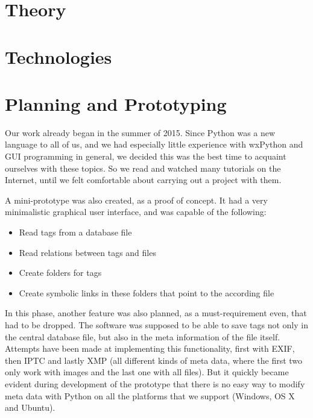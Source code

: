 \section{Theory}
\def \kapitelautor {Christoph Führer}

\section{Technologies}
\def \kapitelautor {Christoph Führer}

\section{Planning and Prototyping} %
\def \kapitelautor {Erik Ritschl}

Our work already began in the summer of 2015. Since Python was a new language to all of us, and we had especially little experience with wxPython and GUI programming in general, we decided this was the best time to acquaint ourselves with these topics. So we read and watched many tutorials on the Internet, until we felt comfortable about carrying out a project with them.

A mini-prototype was also created, as a proof of concept. It had a very minimalistic graphical user interface, and was capable of the following:

\begin{itemize}
	\item Read tags from a database file
	\item Read relations between tags and files
	\item Create folders for tags
	\item Create symbolic links in these folders that point to the according file
\end{itemize}

In this phase, another feature was also planned, as a must-requirement even, that had to be dropped. The software was supposed to be able to save tags not only in the central database file, but also in the meta information of the file itself. Attempts have been made at implementing this functionality, first with EXIF, then IPTC and lastly XMP (all different kinds of meta data, where the first two only work with images and the last one with all files). But it quickly became evident during development of the prototype that there is no easy way to modify meta data with Python on all the platforms that we support (Windows, OS X and Ubuntu).
